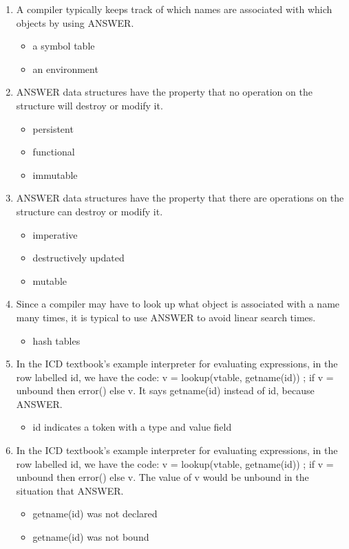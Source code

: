 \documentclass{exam}
\begin{document}
\begin{enumerate}
\begin{itemize}
\end{itemize}
\item A compiler typically keeps track of which names are associated with which objects by using ANSWER.
\begin{itemize}
\item a symbol table
\item an environment
\end{itemize}
\item ANSWER data structures have the property that no operation on the structure will destroy or modify it.
\begin{itemize}
\item persistent
\item functional
\item immutable
\end{itemize}
\item ANSWER data structures have the property that there are operations on the structure can destroy or modify it.
\begin{itemize}
\item imperative
\item destructively updated
\item mutable
\end{itemize}
\item Since a compiler may have to look up what object is associated with a name many times, it is typical to use ANSWER to avoid linear search times.
\begin{itemize}
\item hash tables
\end{itemize}
\item In the ICD textbook's example interpreter for evaluating expressions, in the row labelled id, we have the code: v = lookup(vtable, getname(id)) ; if v = unbound then error() else v.  It says getname(id) instead of id, because ANSWER.
\begin{itemize}
\item id indicates a token with a type and value field
\end{itemize}
\item In the ICD textbook's example interpreter for evaluating expressions, in the row labelled id, we have the code: v = lookup(vtable, getname(id)) ; if v = unbound then error() else v.  The value of v would be unbound in the situation that ANSWER.
\begin{itemize}
\item getname(id) was not declared
\item getname(id) was not bound

\end{itemize}
\end{enumerate}
\end{document}
